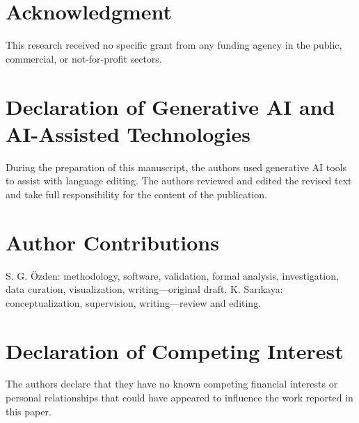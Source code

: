 \documentclass[journal]{IEEEtran}
\begin{document}
\section*{Acknowledgment}
This research received no specific grant from any funding agency in the public, commercial, or not-for-profit sectors.

\section*{Declaration of Generative AI and AI-Assisted Technologies}
During the preparation of this manuscript, the authors used generative AI tools to assist with language editing. The authors reviewed and edited the revised text and take full responsibility for the content of the publication.

\section*{Author Contributions}
S. G. \"Ozden: methodology, software, validation, formal analysis, investigation, data curation, visualization, writing---original draft. K. Sar{\i}kaya: conceptualization, supervision, writing---review and editing.

\section*{Declaration of Competing Interest}
The authors declare that they have no known competing financial interests or personal relationships that could have appeared to influence the work reported in this paper.



\end{document}
